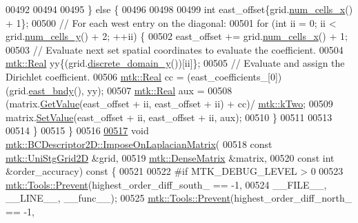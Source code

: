 \begin{DoxyCode}
00492 
00494 
00495   \} \textcolor{keywordflow}{else} \{
00496 
00498 
00499     \textcolor{keywordtype}{int} east\_offset\{grid.\hyperlink{classmtk_1_1UniStgGrid2D_a2d182866a398aba8e4829590e85bf939}{num\_cells\_x}() + 1\};
00500     \textcolor{comment}{// For each west entry on the diagonal:}
00501     \textcolor{keywordflow}{for} (\textcolor{keywordtype}{int} ii = 0; ii < grid.\hyperlink{classmtk_1_1UniStgGrid2D_aed05a801cc9a76dba0ff203cea58a61a}{num\_cells\_y}() + 2; ++ii) \{
00502       east\_offset += grid.\hyperlink{classmtk_1_1UniStgGrid2D_a2d182866a398aba8e4829590e85bf939}{num\_cells\_x}() + 1;
00503       \textcolor{comment}{// Evaluate next set spatial coordinates to evaluate the coefficient.}
00504       \hyperlink{group__c01-roots_gac080bbbf5cbb5502c9f00405f894857d}{mtk::Real} yy\{(grid.\hyperlink{classmtk_1_1UniStgGrid2D_ac33a58d65105550dcf6f6b92b48b5105}{discrete\_domain\_y}())[ii]\};
00505       \textcolor{comment}{// Evaluate and assign the Dirichlet coefficient.}
00506       \hyperlink{group__c01-roots_gac080bbbf5cbb5502c9f00405f894857d}{mtk::Real} cc = (east\_coefficients\_[0])(grid.\hyperlink{classmtk_1_1UniStgGrid2D_a03f689eb29a6369b82ce1207c655d5ff}{east\_bndy}(), yy);
00507       \hyperlink{group__c01-roots_gac080bbbf5cbb5502c9f00405f894857d}{mtk::Real} aux =
00508         (matrix.\hyperlink{classmtk_1_1DenseMatrix_a4b23ecbebd970b5eea915dbb50691024}{GetValue}(east\_offset + ii, east\_offset + ii) + cc)/
      \hyperlink{group__c01-roots_gaf39c2d851a2db744f4feb1c5ab3ec2cf}{mtk::kTwo};
00509       matrix.\hyperlink{classmtk_1_1DenseMatrix_a784ce5784109ac86bfb9d8562b334b13}{SetValue}(east\_offset + ii, east\_offset + ii, aux);
00510     \}
00511 
00513 
00514   \}
00515 \}
00516 
\hypertarget{mtk__bc__descriptor__2d_8cc_source_l00517}{}\hyperlink{classmtk_1_1BCDescriptor2D_a35592617dda3b965b680b2a1355122f4}{00517} \textcolor{keywordtype}{void} \hyperlink{classmtk_1_1BCDescriptor2D_a35592617dda3b965b680b2a1355122f4}{mtk::BCDescriptor2D::ImposeOnLaplacianMatrix}(
00518     \textcolor{keyword}{const} \hyperlink{classmtk_1_1UniStgGrid2D}{mtk::UniStgGrid2D} &grid,
00519     \hyperlink{classmtk_1_1DenseMatrix}{mtk::DenseMatrix} &matrix,
00520     \textcolor{keyword}{const} \textcolor{keywordtype}{int} &order\_accuracy)\textcolor{keyword}{ const }\{
00521 
00522 \textcolor{preprocessor}{  #if MTK\_DEBUG\_LEVEL > 0}
00523   \hyperlink{classmtk_1_1Tools_a332324c6f25e66be9dff48c5987a3b9f}{mtk::Tools::Prevent}(highest\_order\_diff\_south\_ == -1,
00524                       \_\_FILE\_\_, \_\_LINE\_\_, \_\_func\_\_);
00525   \hyperlink{classmtk_1_1Tools_a332324c6f25e66be9dff48c5987a3b9f}{mtk::Tools::Prevent}(highest\_order\_diff\_north\_ == -1,

\end{DoxyCode}
